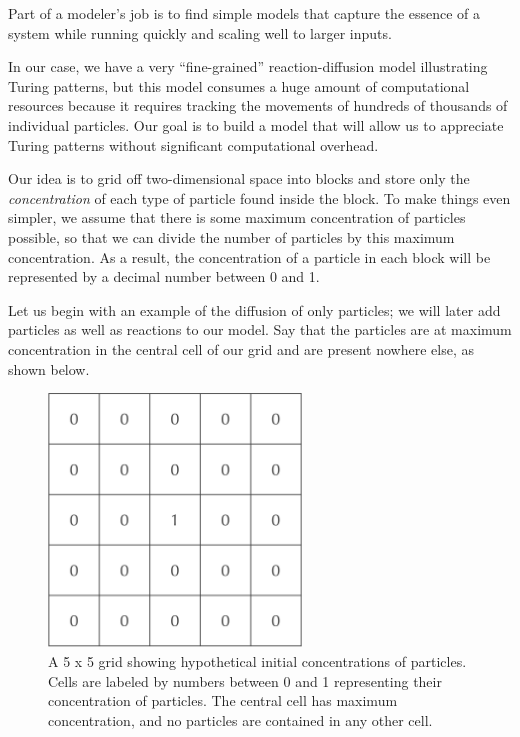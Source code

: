 {Part of a modeler's job is to find simple models that capture the essence of a system while running quickly and scaling well to larger inputs.

In our case, we have a very ``fine-grained'' reaction-diffusion model illustrating Turing patterns, but this model consumes a huge amount of computational resources because it requires tracking the movements of hundreds of thousands of individual particles. Our goal is to build a model that will allow us to appreciate Turing patterns without significant computational overhead.

Our idea is to grid off two-dimensional space into blocks and store only the \textit{concentration} of each type of particle found inside the block. To make things even simpler, we assume that there is some maximum concentration of particles possible, so that we can divide the number of particles by this maximum concentration. As a result, the concentration of a particle in each block will be represented by a decimal number between 0 and 1.

Let us begin with an example of the diffusion of only  particles; we will later add  particles as well as reactions to our model. Say that the particles are at maximum concentration in the central cell of our grid and are present nowhere else, as shown below.

\begin{figure}[h]
\centering
\mySfFamily
\includegraphics[width = 0.6\textwidth]{../images/initial_A_concentration.png}
\caption{A 5 x 5 grid showing hypothetical initial concentrations of  particles. Cells are labeled by numbers between 0 and 1 representing their concentration of  particles. The central cell has maximum concentration, and no particles are contained in any other cell.}
\label{fig:initial_A_concentration}
\end{figure}

}
